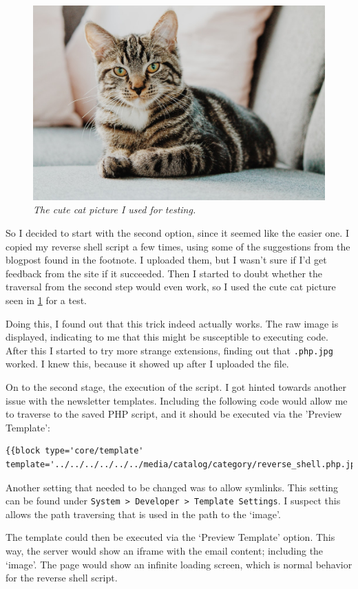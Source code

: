 \begin{figure}
	\centering
	\captionsetup{justification=centering, font=small}
	\noindent \includegraphics[width=\linewidth]{figures/cat.jpeg}
	\caption{\scriptsize{\emph{The cute cat picture I used for testing.}}}
	\label{fig:cat}
\end{figure}

So I decided to start with the second option, since it seemed like the easier one. I copied my reverse shell script a few times, using some of the suggestions from the blogpost found in the footnote. I uploaded them, but I wasn't sure if I'd get feedback from the site if it succeeded. Then I started to doubt whether the traversal from the second step would even work, so I used the cute cat picture seen in \cref{fig:cat} for a test.

Doing this, I found out that this trick indeed actually works. The raw image is displayed, indicating to me that this might be susceptible to executing code. After this I started to try more strange extensions, finding out that \verb|.php.jpg| worked. I knew this, because it showed up after I uploaded the file.

On to the second stage, the execution of the script. I got hinted towards another issue with the newsletter templates. Including the following code would allow me to traverse to the saved PHP script, and it should be executed via the 'Preview Template': 

\begin{Verbatim}[breaklines=true, breakanywhere=true]
    {{block type='core/template' template='../../../../../../media/catalog/category/reverse_shell.php.jpg}}
\end{Verbatim}

Another setting that needed to be changed was to allow symlinks. This setting can be found under \verb|System > Developer > Template Settings|. I suspect this allows the path traversing that is used in the path to the `image'.

The template could then be executed via the `Preview Template' option. This way, the server would show an iframe with the email content; including the `image'. The page would show an infinite loading screen, which is normal behavior for the reverse shell script.